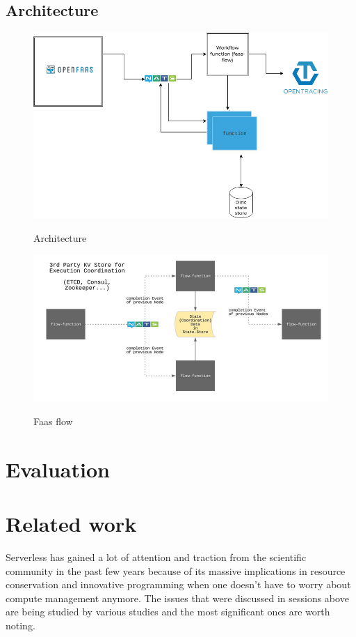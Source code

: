 \documentclass[12pt,titlepage]{article}
\begin{document}
\subsection{Architecture}
\label{sec:orgefc215f}
\begin{figure}[!h]
    \caption{Architecture}
    \centering
    \includegraphics[width=130mm]{./thesis_images/architecture.png}
    \label{fig:arch}
\end{figure}

\begin{figure}[!h]
    \caption{Faas flow}
    \centering
    \includegraphics[width=130mm]{./thesis_images/faas-flow.png}
    \label{fig:faas-flow}
\end{figure}
\section{Evaluation}
\label{sec:org4045af2}
\section{Related work}
\label{sec:org59622f5}
Serverless has gained a lot of attention and traction from the scientific
community in the past few years because of its massive implications in resource
conservation and innovative programming when one doesn't have to worry about
compute management anymore. The issues that were discussed in sessions above are
being studied by various studies and the most significant ones are worth noting.
\end{document}
